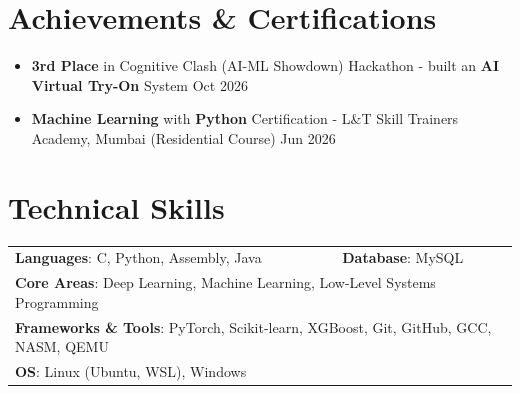 \documentclass[letterpaper,11pt]{article}
\newcommand{\resumeItem}[1]{
  \item\small{
    {#1 \vspace{-1pt}}
  }
}
\newcommand{\resumeItemListStart}{\begin{itemize}}
\newcommand{\resumeItemListEnd}{\end{itemize}\vspace{-4pt}}
\begin{document}
\section{Achievements \& Certifications}
    \resumeItemListStart
        \resumeItem{\textbf{3rd Place} in Cognitive Clash (AI-ML Showdown) Hackathon - built an \textbf{AI Virtual Try-On} System \hfill Oct 2026}
        \vspace{-2pt}
        \resumeItem{\textbf{Machine Learning} with \textbf{Python} Certification - L\&T Skill Trainers Academy, Mumbai (Residential Course) \hfill Jun 2026}
    \resumeItemListEnd

\newpage
\vspace*{1pt}
\vspace{-15pt}

\section{Technical Skills}
    \vspace{-2pt}
    \begin{itemize}[leftmargin=0.2in, label={}]
        {\item{
            \begin{tabular}{ l@{\hspace{1.0in}} l }
                 \textbf{Languages}: C, Python, Assembly, Java & \textbf{Database}: MySQL\\
                 \multicolumn{2}{l}{\textbf{Core Areas}: Deep Learning, Machine Learning, Low-Level Systems Programming}\\
                 \multicolumn{2}{l}{\textbf{Frameworks \& Tools}: PyTorch, Scikit-learn, XGBoost, Git, GitHub, GCC, NASM, QEMU}\\
                 \multicolumn{2}{l}{\textbf{OS}: Linux (Ubuntu, WSL), Windows}\\
            \end{tabular}
        }}
    \end{itemize}
\end{document}
